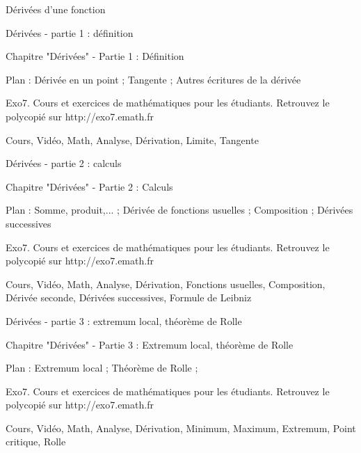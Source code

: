 
   Dérivées d'une fonction

Dérivées - partie 1 : définition



Chapitre "Dérivées" - Partie 1 : Définition

Plan : Dérivée en un point ; Tangente ; Autres écritures de la dérivée

Exo7. Cours et exercices de mathématiques pour les étudiants.
Retrouvez le polycopié sur http://exo7.emath.fr


Cours, Vidéo, Math, Analyse, Dérivation, Limite, Tangente




Dérivées - partie 2 : calculs



Chapitre "Dérivées" - Partie 2 : Calculs

Plan : Somme, produit,... ; Dérivée de fonctions usuelles ;
Composition ; Dérivées successives

Exo7. Cours et exercices de mathématiques pour les étudiants.
Retrouvez le polycopié sur http://exo7.emath.fr


Cours, Vidéo, Math, Analyse, Dérivation, Fonctions usuelles, Composition, 
Dérivée seconde, Dérivées successives, Formule de Leibniz 




Dérivées - partie 3 : extremum local, théorème de Rolle



Chapitre "Dérivées" - Partie 3 : Extremum local, théorème de Rolle

Plan : Extremum local ; Théorème de Rolle ; 

Exo7. Cours et exercices de mathématiques pour les étudiants.
Retrouvez le polycopié sur http://exo7.emath.fr


Cours, Vidéo, Math, Analyse, Dérivation, Minimum, Maximum, Extremum, Point critique, Rolle



